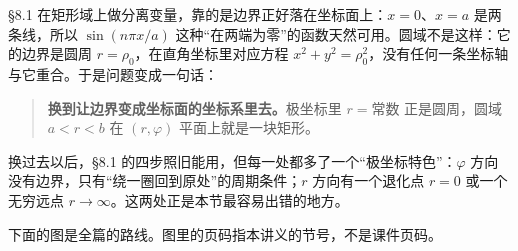 \documentclass[11pt]{ctexart}
\let\orighdr\hdr
\renewcommand{\hdr}[2]{\par\needspace{6\baselineskip}\orighdr{#1}{#2}}
\begin{document}
\label{sec:s0}

\S8.1 在矩形域上做分离变量，靠的是边界正好落在坐标面上：$x=0$、$x=a$ 是两条线，所以 $\sin(n\pi x/a)$ 这种“在两端为零”的函数天然可用。圆域不是这样：它的边界是圆周 $r=\rho_0$，在直角坐标里对应方程 $x^2+y^2=\rho_0^2$，没有任何一条坐标轴与它重合。于是问题变成一句话：

\begin{quote}
\textbf{换到让边界变成坐标面的坐标系里去。}极坐标里 $r=\text{常数}$ 正是圆周，圆域 $a<r<b$ 在 $(r,\varphi)$ 平面上就是一块矩形。
\end{quote}

换过去以后，\S8.1 的四步照旧能用，但每一处都多了一个“极坐标特色”：$\varphi$ 方向没有边界，只有“绕一圈回到原处”的周期条件；$r$ 方向有一个退化点 $r=0$ 或一个无穷远点 $r\to\infty$。这两处正是本节最容易出错的地方。

下面的图是全篇的路线。图里的页码指本讲义的节号，不是课件页码。
\end{document}
